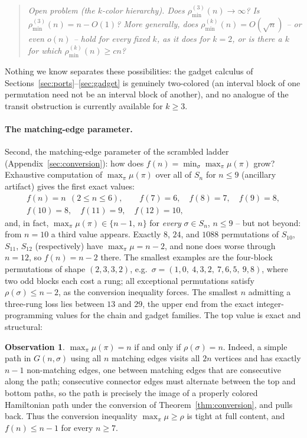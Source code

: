 \documentclass[11pt]{article}
\theoremstyle{definition}
\newtheorem{observation}[theorem]{Observation}
\newcommand{\pminK}[1]{\rho_{\min}^{(#1)}}
\begin{document}
\begin{quote}
\emph{Open problem (the $k$-color hierarchy). Does $\pminK{3}(n) \to \infty$?
Is $\pminK{3}(n) = n - O(1)$? More generally, does $\pminK{k}(n) = O(\sqrt n)$
-- or even $o(n)$ -- hold for every fixed $k$, as it does for $k = 2$, or is
there a $k$ for which $\pminK{k}(n) \ge cn$?}
\end{quote}

Nothing we know separates these possibilities: the gadget calculus of
Sections~\ref{sec:ports}--\ref{sec:gadget} is genuinely two-colored (an
interval block of one permutation need not be an interval block of another),
and no analogue of the transit obstruction is currently available for $k \ge 3$.

\paragraph{The matching-edge parameter.}
Second, the matching-edge parameter of the scrambled ladder
(Appendix~\ref{sec:conversion}): how does
$f(n) = \min_\sigma \max_\pi \mu(\pi)$ grow? Exhaustive computation of
$\max_\pi \mu(\pi)$ over all of $S_n$ for $n \le 9$ (ancillary artifact) gives
the first exact values:
\begin{gather*}
f(n) = n \ \ (2 \le n \le 6), \qquad f(7) = 6, \quad f(8) = 7, \quad f(9) = 8,\\
f(10) = 8, \quad f(11) = 9, \quad f(12) = 10 ,
\end{gather*}
and, in fact, $\max_\pi \mu(\pi) \in \{n-1,\, n\}$ for \emph{every} $\sigma \in S_n$,
$n \le 9$ -- but not beyond: from $n = 10$ a third value appears. Exactly
$8$, $24$, and $1088$ permutations of $S_{10}$, $S_{11}$, $S_{12}$ (respectively)
have $\max_\pi \mu = n-2$, and none does worse through $n = 12$, so
$f(n) = n-2$ there. The smallest examples are the four-block permutations of
shape $(2,3,3,2)$, e.g.\ $\sigma = (1,0,\ 4,3,2,\ 7,6,5,\ 9,8)$, where two
odd blocks each cost a rung; all exceptional permutations satisfy
$\rho(\sigma) \le n-2$, as the conversion inequality forces. The smallest $n$
admitting a three-rung loss lies between $13$ and $29$, the upper end from the
exact integer-programming values for the chain and gadget families. The top
value is exact and structural:

\begin{observation}\label{obs:topcontent}
$\max_\pi \mu(\pi) = n$ if and only if $\rho(\sigma) = n$. Indeed, a simple
path in $G(n,\sigma)$ using all $n$ matching edges visits all $2n$ vertices and
has exactly $n-1$ non-matching edges, one between matching edges that are consecutive
along the path; consecutive connector edges must alternate between the top and bottom paths,
so the path is precisely the image of a properly colored Hamiltonian path
under the conversion of Theorem~\ref{thm:conversion}, and pulls back. Thus the
conversion inequality $\max_\pi \mu \ge \rho$ is tight at full content, and
$f(n) \le n-1$ for every $n \ge 7$.
\end{observation}
\end{document}
